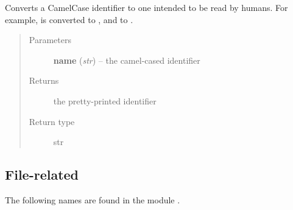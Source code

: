 \documentclass[a4paper,11pt,english]{sphinxmanual}
\begin{document}

\begin{fulllineitems}
\label{programming/utilities:jb_common.utils.base.camel_case_to_human_text}
Converts a CamelCase identifier to one intended to be read by humans.
For example,  is converted to , and
 to .
\begin{quote}\begin{description}
\item[{Parameters}] \leavevmode
\textbf{name} (\emph{str}) -- the camel-cased identifier

\item[{Returns}] \leavevmode
the pretty-printed identifier

\item[{Return type}] \leavevmode
str

\end{description}\end{quote}

\end{fulllineitems}



\subsection{File-related}
\label{programming/utilities:file-related}
The following names are found in the module .
\end{document}
